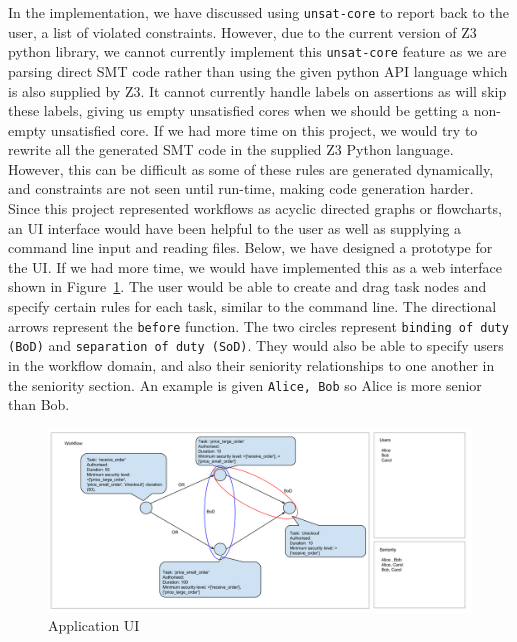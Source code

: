 \documentclass[a4paper]{report}
\begin{document}
In the implementation, we have discussed using \texttt{unsat-core} to report back to the user, a list of violated constraints. However, due to the current version of Z3 python library, we cannot currently implement this \texttt{unsat-core} feature as we are parsing direct SMT code rather than using the given python API language which is also supplied by Z3. It cannot currently handle labels on assertions as will skip these labels, giving us empty unsatisfied cores when we should be getting a non-empty unsatisfied core. If we had more time on this project, we would try to rewrite all the generated SMT code in the supplied Z3 Python language. However, this can be difficult as some of these rules are generated dynamically, and constraints are not seen until run-time, making code generation harder. \\

Since this project represented workflows as acyclic directed graphs or flowcharts, an UI interface would have been helpful to the user as well as supplying a command line input and reading files. Below, we have designed a prototype for the UI. If we had more time, we would have implemented this as a web interface shown in Figure~\ref{fig:Application UI}. The user would be able to create and drag task nodes and specify certain rules for each task, similar to the command line. The directional arrows represent the \texttt{before} function. The two circles represent \texttt{binding of duty (BoD)} and \texttt{separation of duty (SoD)}. They would also be able to specify users in the workflow domain, and also their seniority relationships to one another in the seniority section. An example is given \texttt{Alice, Bob} so Alice is more senior than Bob.

\begin{figure}
\includegraphics[scale=0.35, angle=90,origin=c]{ui.png}
\caption{Application UI}
\label{fig:Application UI}
\end{figure}
\end{document}
